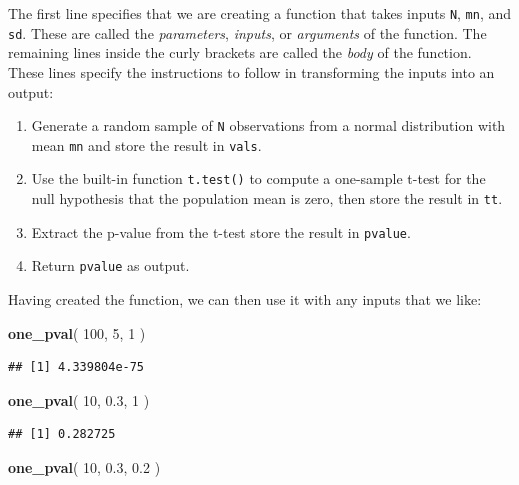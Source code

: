 \documentclass[
]{book}
\newenvironment{Shaded}{\begin{snugshade}}{\end{snugshade}}
\newcommand{\DecValTok}[1]{\textcolor[rgb]{0.00,0.00,0.81}{#1}}
\newcommand{\FloatTok}[1]{\textcolor[rgb]{0.00,0.00,0.81}{#1}}
\newcommand{\FunctionTok}[1]{\textcolor[rgb]{0.13,0.29,0.53}{\textbf{#1}}}
\newcommand{\NormalTok}[1]{#1}
\providecommand{\tightlist}{%
  \setlength{\itemsep}{0pt}\setlength{\parskip}{0pt}}
\begin{document}
The first line specifies that we are creating a function that takes inputs \texttt{N}, \texttt{mn}, and \texttt{sd}. These are called the \emph{parameters}, \emph{inputs}, or \emph{arguments} of the function. The remaining lines inside the curly brackets are called the \emph{body} of the function. These lines specify the instructions to follow in transforming the inputs into an output:

\begin{enumerate}
\def\labelenumi{\arabic{enumi}.}
\tightlist
\item
  Generate a random sample of \texttt{N} observations from a normal distribution with mean \texttt{mn} and store the result in \texttt{vals}.
\item
  Use the built-in function \texttt{t.test()} to compute a one-sample t-test for the null hypothesis that the population mean is zero, then store the result in \texttt{tt}.
\item
  Extract the p-value from the t-test store the result in \texttt{pvalue}.
\item
  Return \texttt{pvalue} as output.
\end{enumerate}

Having created the function, we can then use it with any inputs that we like:

\begin{Shaded}
\begin{Highlighting}[]
\FunctionTok{one\_pval}\NormalTok{( }\DecValTok{100}\NormalTok{, }\DecValTok{5}\NormalTok{, }\DecValTok{1}\NormalTok{ )}
\end{Highlighting}
\end{Shaded}

\begin{verbatim}
## [1] 4.339804e-75
\end{verbatim}

\begin{Shaded}
\begin{Highlighting}[]
\FunctionTok{one\_pval}\NormalTok{( }\DecValTok{10}\NormalTok{, }\FloatTok{0.3}\NormalTok{, }\DecValTok{1}\NormalTok{ )}
\end{Highlighting}
\end{Shaded}

\begin{verbatim}
## [1] 0.282725
\end{verbatim}

\begin{Shaded}
\begin{Highlighting}[]
\FunctionTok{one\_pval}\NormalTok{( }\DecValTok{10}\NormalTok{, }\FloatTok{0.3}\NormalTok{, }\FloatTok{0.2}\NormalTok{ )}
\end{Highlighting}
\end{Shaded}
\end{document}
